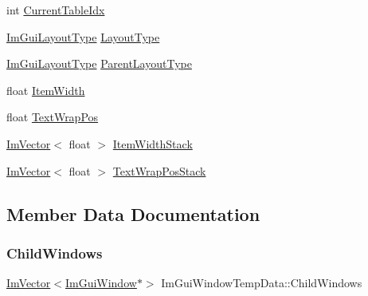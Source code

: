 \begin{DoxyCompactItemize}
int \hyperlink{structImGuiWindowTempData_a684f9cd8726dc846a633011d22367e90}{Current\+Table\+Idx}
\item 
\hyperlink{imgui__internal_8h_a86d7bb2ee8297d38b131d8ea7e6430c6}{Im\+Gui\+Layout\+Type} \hyperlink{structImGuiWindowTempData_a56c2607a6965314ec05a351ac6b68c83}{Layout\+Type}
\item 
\hyperlink{imgui__internal_8h_a86d7bb2ee8297d38b131d8ea7e6430c6}{Im\+Gui\+Layout\+Type} \hyperlink{structImGuiWindowTempData_af5f90b71ddcca637fdfd84827d096a9a}{Parent\+Layout\+Type}
\item 
float \hyperlink{structImGuiWindowTempData_abc1312710a2091709415d425d2ffc971}{Item\+Width}
\item 
float \hyperlink{structImGuiWindowTempData_a4f9366e24dce97f0cc3ecc0e19436db5}{Text\+Wrap\+Pos}
\item 
\hyperlink{structImVector}{Im\+Vector}$<$ float $>$ \hyperlink{structImGuiWindowTempData_ac3be9bc08a4ab80a67c6ebc48f4e578a}{Item\+Width\+Stack}
\item 
\hyperlink{structImVector}{Im\+Vector}$<$ float $>$ \hyperlink{structImGuiWindowTempData_aa65230cd1350ef584984919a7fa4c92b}{Text\+Wrap\+Pos\+Stack}
\end{DoxyCompactItemize}


\subsection{Member Data Documentation}
\mbox{\label{structImGuiWindowTempData_ac5ffaaf397b8501b523aa55aa7d34d3d}} 
\subsubsection{\texorpdfstring{Child\+Windows}{ChildWindows}}
{\footnotesize\ttfamily \hyperlink{structImVector}{Im\+Vector}$<$\hyperlink{structImGuiWindow}{Im\+Gui\+Window}$\ast$$>$ Im\+Gui\+Window\+Temp\+Data\+::\+Child\+Windows}

\mbox{\label{structImGuiWindowTempData_af86ba9662f7aeb95c49e785d941f4c69}} 
